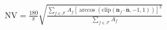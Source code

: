 ${\text{NV}} = \frac{{180}}{\pi }\sqrt {\frac{{\sum\limits_{f \in \mathcal{F}} {{A_f}} {{\left[ {\arccos \left( {{\text{clip}}({{\mathbf{n}}_f} \cdot \overline {\mathbf{n}} , - 1,1)} \right)} \right]}^2}}}{{\sum\limits_{f \in \mathcal{F}} {{A_f}} }}} $
